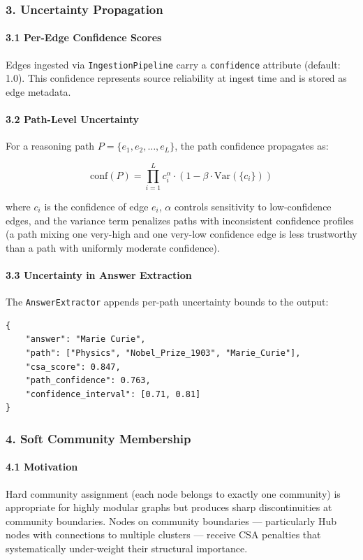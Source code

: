 \subsubsection{3. Uncertainty Propagation}

\paragraph{3.1 Per-Edge Confidence Scores}
Edges ingested via \texttt{IngestionPipeline} carry a \texttt{confidence} attribute (default: 1.0). This confidence represents source reliability at ingest time and is stored as edge metadata.

\paragraph{3.2 Path-Level Uncertainty}
For a reasoning path $P = \{e_1, e_2, \ldots, e_L\}$, the path confidence propagates as:

\begin{equation}
\text{conf}(P) = \prod_{i=1}^{L} c_i^{\alpha} \cdot \left(1 - \beta \cdot \text{Var}(\{c_i\})\right)
\end{equation}

where $c_i$ is the confidence of edge $e_i$, $\alpha$ controls sensitivity to low-confidence edges, and the variance term penalizes paths with incon\-sistent confidence profiles (a path mixing one very-high and one very-low confidence edge is less trustworthy than a path with uniformly moderate confidence).

\paragraph{3.3 Uncertainty in Answer Extraction}
The \texttt{AnswerExtractor} appends per-path uncertainty bounds to the output:

\begin{lstlisting}
{
    "answer": "Marie Curie",
    "path": ["Physics", "Nobel_Prize_1903", "Marie_Curie"],
    "csa_score": 0.847,
    "path_confidence": 0.763,
    "confidence_interval": [0.71, 0.81]
}
\end{lstlisting}

\subsubsection{4. Soft Community Membership}

\paragraph{4.1 Motivation}
Hard community assignment (each node belongs to exactly one community) is appropriate for highly modular graphs but produces sharp disco\-ntinuities at community boundaries. Nodes on community boundaries — parti\-cularly Hub nodes with connections to multiple clusters — receive CSA penalties that syste\-matically under-weight their structural importance.

